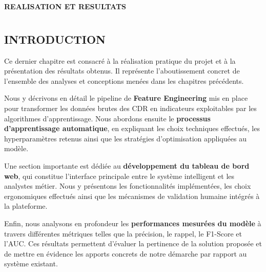 \documentclass[12pt, oneside, a4paper]{report}
\begin{document}
\begin{center}
    {\huge\textbf{REALISATION ET RESULTATS}}
\end{center}
\vspace{1cm}

\begingroup
\let\cleardoublepage\relax
\let\clearpage\relax
\chapter*{} %
\vspace{-3cm} %
\minitoc
\endgroup

\vspace{1.5cm}
\minitoc

\section{INTRODUCTION}
Ce dernier chapitre est consacré à la réalisation pratique du projet et à la présentation des résultats obtenus. Il représente l'aboutissement concret de l'ensemble des analyses et conceptions menées dans les chapitres précédents.

Nous y décrivons en détail le pipeline de \textbf{Feature Engineering} mis en place pour transformer les données brutes des CDR en indicateurs exploitables par les algorithmes d'apprentissage. Nous abordons ensuite le \textbf{processus d'apprentissage automatique}, en expliquant les choix techniques effectués, les hyperparamètres retenus ainsi que les stratégies d'optimisation appliquées au modèle.

Une section importante est dédiée au \textbf{développement du tableau de bord web}, qui constitue l'interface principale entre le système intelligent et les analystes métier. Nous y présentons les fonctionnalités implémentées, les choix ergonomiques effectués ainsi que les mécanismes de validation humaine intégrés à la plateforme.

Enfin, nous analysons en profondeur les \textbf{performances mesurées du modèle} à travers différentes métriques telles que la précision, le rappel, le F1-Score et l'AUC. Ces résultats permettent d'évaluer la pertinence de la solution proposée et de mettre en évidence les apports concrets de notre démarche par rapport au système existant.
\end{document}
